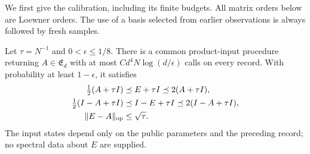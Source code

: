 We first give the calibration, including its finite budgets.  All
matrix orders below are Loewner orders.  The use of a basis selected
from earlier observations is always followed by fresh samples.

\begin{lemma}
\label{lem:matrixcalibration77}
Let $\tau=N^{-1}$ and $0<\epsilon\le1/8$.  There is a common
product-input procedure returning $A\in\mathfrak E_d$ with at most
$Cd^4N\log(d/\epsilon)$ calls on every record.  With probability at
least $1-\epsilon$, it satisfies
\begin{align}
 \tfrac12(A+\tau I)&\preceq E+\tau I\preceq2(A+\tau I),
                                      \label{eq:matrixcalibrationplus77}\\
 \tfrac12(I-A+\tau I)&\preceq I-E+\tau I
                                  \preceq2(I-A+\tau I),
                                      \label{eq:matrixcalibrationminus77}\\
 \|E-A\|_{\rm op}&\le\sqrt\tau.
                                      \label{eq:matrixcalibrationnorm77}
\end{align}
The input states depend only on the public parameters and the
preceding record; no spectral data about $E$ are supplied.
\end{lemma}
